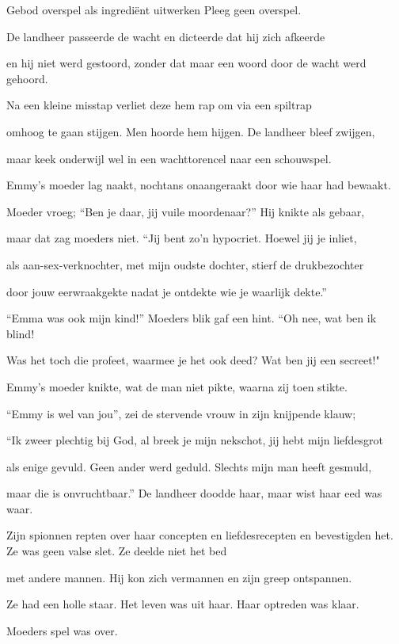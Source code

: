 Gebod overspel als ingrediënt uitwerken Pleeg geen overspel.

De landheer passeerde
de wacht en dicteerde
dat hij zich afkeerde

en hij niet werd gestoord,
zonder dat maar een woord
door de wacht werd gehoord.

Na een kleine misstap
verliet deze hem rap
om via een spiltrap

omhoog te gaan stijgen.
Men hoorde hem hijgen.
De landheer bleef zwijgen,

maar keek onderwijl wel
in een wachttorencel
naar een schouwspel.

Emmy’s moeder lag naakt,
nochtans onaangeraakt
door wie haar had bewaakt.

Moeder vroeg; “Ben je daar,
jij vuile moordenaar?”
Hij knikte als gebaar,

maar dat zag moeders niet.
“Jij bent zo’n hypocriet.
Hoewel jij je inliet,

als aan-sex-verknochter,
met mijn oudste dochter,
stierf de drukbezochter

door jouw eerwraakgekte
nadat je ontdekte
wie je waarlijk dekte.”

“Emma was ook mijn kind!”
Moeders blik gaf een hint.
“Oh nee, wat ben ik blind!

Was het toch die profeet,
waarmee je het ook deed?
Wat ben jij een secreet!"

Emmy’s moeder knikte,
wat de man niet pikte,
waarna zij toen stikte.

“Emmy is wel van jou”,
zei de stervende vrouw
in zijn knijpende klauw;

“Ik zweer plechtig bij God,
al breek je mijn nekschot,
jij hebt mijn liefdesgrot

als enige gevuld.
Geen ander werd geduld.
Slechts mijn man heeft gesmuld,

maar die is onvruchtbaar.”
De landheer doodde haar,
maar wist haar eed was waar.

Zijn spionnen repten
over haar concepten
en liefdesrecepten
en bevestigden het.
Ze was geen valse slet.
Ze deelde niet het bed

met andere mannen.
Hij kon zich vermannen
en zijn greep ontspannen.

Ze had een holle staar.
Het leven was uit haar.
Haar optreden was klaar.

Moeders spel was over.
